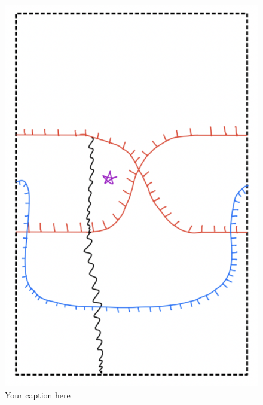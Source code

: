\begin{figure}[H] %
    \centering
    \includegraphics[scale=0.95]{diagrams/lemma9/9.png} %
    \caption{Your caption here}
    \label{fig:your-label}
\end{figure}

